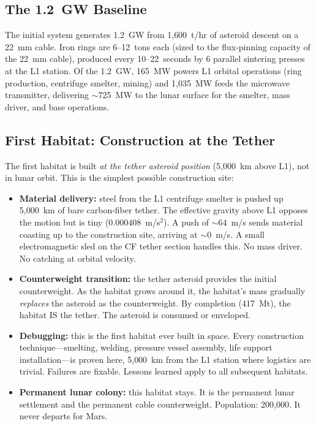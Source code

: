 \documentclass[12pt,letterpaper]{article}
\begin{document}
\subsection{The 1.2~GW Baseline}

The initial system generates 1.2~GW from 1{,}600~t/hr of asteroid descent on a 22~mm cable. Iron rings are 6--12~tons each (sized to the flux-pinning capacity of the 22~mm cable), produced every 10--22~seconds by 6 parallel sintering presses at the L1 station. Of the 1.2~GW, 165~MW powers L1 orbital operations (ring production, centrifuge smelter, mining) and 1{,}035~MW feeds the microwave transmitter, delivering ${\sim}$725~MW to the lunar surface for the smelter, mass driver, and base operations.

\subsection{First Habitat: Construction at the Tether}

The first habitat is built \emph{at the tether asteroid position} (5{,}000~km above L1), not in lunar orbit. This is the simplest possible construction site:

\begin{itemize}[nosep]
\item \textbf{Material delivery:} steel from the L1 centrifuge smelter is pushed up 5{,}000~km of bare carbon-fiber tether. The effective gravity above L1 opposes the motion but is tiny ($0.000408$~m/s$^2$). A push of ${\sim}$64~m/s sends material coasting up to the construction site, arriving at ${\sim}$0~m/s. A small electromagnetic sled on the CF tether section handles this. No mass driver. No catching at orbital velocity.
\item \textbf{Counterweight transition:} the tether asteroid provides the initial counterweight. As the habitat grows around it, the habitat's mass gradually \emph{replaces} the asteroid as the counterweight. By completion (417~Mt), the habitat IS the tether. The asteroid is consumed or enveloped.
\item \textbf{Debugging:} this is the first habitat ever built in space. Every construction technique---smelting, welding, pressure vessel assembly, life support installation---is proven here, 5{,}000~km from the L1 station where logistics are trivial. Failures are fixable. Lessons learned apply to all subsequent habitats.
\item \textbf{Permanent lunar colony:} this habitat stays. It is the permanent lunar settlement and the permanent cable counterweight. Population: 200{,}000. It never departs for Mars.
\end{itemize}
\end{document}
